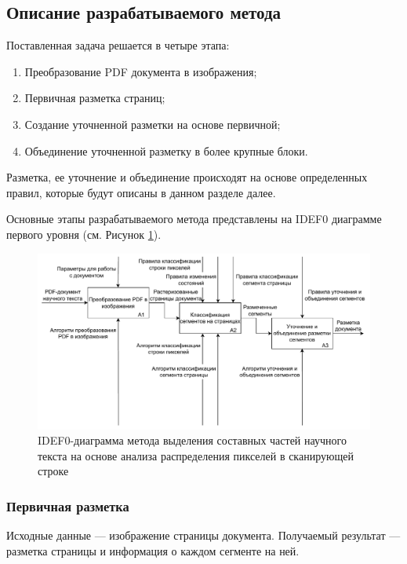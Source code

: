 
\subsection{Описание разрабатываемого метода}

Поставленная задача решается в четыре этапа:
\begin{enumerate}
    \item Преобразование PDF документа в изображения;
    \item Первичная разметка страниц;
    \item Создание уточненной разметки на основе первичной;
    \item Объединение уточненной разметку в более крупные блоки.
\end{enumerate}

Разметка, ее уточнение и объединение происходят на основе определенных правил, которые будут описаны в данном разделе далее.

Основные этапы разрабатываемого метода представлены на IDEF0 диаграмме первого уровня (см. Рисунок \ref{fig:a1}).

\begin{figure}[H]
	\centering
	\includegraphics[width=\textwidth]{diag/a1-big.pdf}
	\caption{IDEF0-диаграмма метода выделения составных частей научного текста на основе анализа распределения пикселей в сканирующей строке}
	\label{fig:a1}
\end{figure}

\subsubsection{Первичная разметка}

Исходные данные --- изображение страницы документа.
Получаемый результат --- разметка страницы и информация о каждом сегменте на ней.


